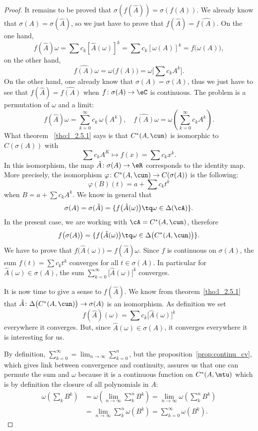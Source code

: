 \begin{proof}
It remains to be proved that $\sigma(f(\hat{A}))=\sigma(f(A))$. We already know that $\sigma(A)=\sigma(\hat{A})$, so we just have to prove that $f(\hat{A})=\widehat{ f(A) }$. On the one hand,
\[
 f(\hat{A})\omega=\sum c_k[\hat{A}(\omega)]^k
        =\sum c_k [\omega(A)]^k
        =f\big( \omega(A) \big),
\]
on the other hand,
\[
  \widehat{ f(A) }\omega=\omega\big( f(A) \big)=\omega\big[ \sum c_k A^k \big].
\]
On the other hand, one already know that $\sigma(A)=\sigma(A)$, thus we just have to see that
$f(\hat A)=\widehat{f(A)}$ when $f\colon \sigma(A)\to \eC$ is continuous. The problem is a permutation of $\omega$ and a limit:
\[
 f(\hat A)\omega=\sum_{k=0}^{\infty} c_k\,\omega(A^k),\quad\widehat{f(A)}\omega=\omega\left(\sum_{k=0}^{\infty} c_kA^k\right).
\]
What theorem ~\ref{tho:l_2.5.1} says is that $C^*(A,\cun)$ is isomorphic to $C(\sigma(A))$ with
\[
  \sum c_kA^K\mapsto f(x)=\sum c_kx^k.
\]
 In this isomorphism, the map $\hat{A}\colon \sigma(A)\to \eR$ corresponds to the identity map. More precisely, the isomorphism $\varphi\colon C^*(A,\cun)\to C(\sigma(A))$ is the following:
\[
  \varphi(B)(t)=a+\sum c_kt^k
\]
when $B=a+\sum c_kA^k$. We know in general that
\[
\sigma(A)=\sigma(\hat{A})=\{ f\big( \hat{A}(\omega) \big)\tq\omega\in\Delta(\cA) \}.
\]
 In the present case, we are working with $\cA=C^*(A,\cun)$, therefore
\[
  f\big( \sigma(A) \big)=\{ f\big( \hat{A}(\omega) \big)\tq \omega\in\Delta\big( C^*(A,\cun) \big) \}.
\]
We have to prove that $f\big( \hat{A}(\omega) \big)=f(\hat{A})\omega$. Since $f$ is continuous on $\sigma(A)$, the sum $f(t)=\sum c_kt^k$ converges for all $t\in\sigma(A)$. In particular for $\hat{A}(\omega)\in\sigma(A)$, the sum $\sum_{k=0}^{\infty}\big[ \hat{A}(\omega) \big]^k$ converges.

It is now time to give a sense to $f(\hat{A})$. We know from theorem~\ref{tho:l_2.5.1} that $\hat{A}\colon \Delta\big( C^*(A,\cun) \big) \to\sigma(A) $ is an isomorphism. As definition we set
 \begin{equation}
  f(\hat{A})(\omega)=\sum c_k\big[ \hat{A}(\omega) \big]^k
\end{equation}
everywhere it converges. But, since $\hat{A}(\omega)\in\sigma(A)$, it converges everywhere it is interesting for us.

By definition, $\sum_{k=0}^{\infty}=\lim_{n\to\infty}\sum_{k=0}^{n}$, but the proposition~\ref{prop:continu_cv}, which gives link between convergence and continuity, assures us that one can permute the sum and $\omega$ because it is a continuous function on $C^*(A,\mtu)$ which is by definition the closure of all polynomials in $A$:
\begin{equation}
\begin{split}
  \omega(\sum_k B^k)&=\omega(\lim_{n\to\infty}\sum_k^n B^k)
                    =\lim_{n\to\infty}\omega(\sum_k^n B^k)\\
            &=\lim_{n\to\infty}\sum_k^n\omega(B^k)
            =\sum_{k=0}^{\infty}\omega(B^k).
\end{split}
\end{equation}



\end{proof}

